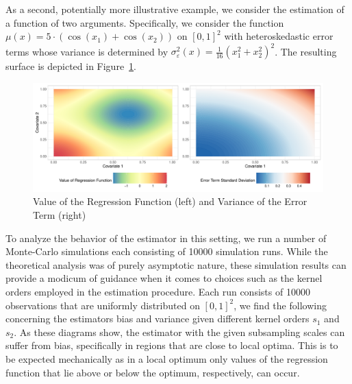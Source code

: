 \newpage
As a second, potentially more illustrative example, we consider the estimation of a function of two arguments.
Specifically, we consider the function $\mu(x) = 5 \cdot \left(\cos(x_1) + \cos(x_2)\right)$ on $[0,1]^2$ with heteroskedastic error terms whose variance is determined by $\sigma_{\varepsilon}^2(x) = \frac{1}{16}\left(x_1^2 + x_2^2\right)^2$.
The resulting surface is depicted in Figure~\ref{fig:reg_surface}.
\begin{figure}[H]
	\centering
	\includegraphics[width = \textwidth]{../Graphics/Reg_Exmp1.pdf}
	\caption{Value of the Regression Function (left) and Variance of the Error Term (right)}
	\label{fig:reg_surface}
\end{figure}
To analyze the behavior of the estimator in this setting, we run a number of Monte-Carlo simulations each consisting of 10000 simulation runs.
While the theoretical analysis was of purely asymptotic nature, these simulation results can provide a modicum of guidance when it comes to choices such as the kernel orders employed in the estimation procedure.
Each run consists of 10000 observations that are uniformly distributed on $[0,1]^2$, we find the following concerning the estimators bias and variance given different kernel orders $s_1$ and $s_2$.
As these diagrams show, the estimator with the given subsampling scales can suffer from bias, specifically in regions that are close to local optima.
This is to be expected mechanically as in a local optimum only values of the regression function that lie above or below the optimum, respectively, can occur.


